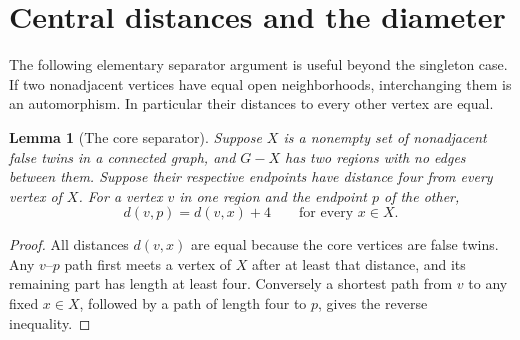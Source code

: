 \documentclass[11pt]{article}
\newtheorem{lemma}[theorem]{Lemma}
\begin{document}
\section*{Central distances and the diameter}

The following elementary separator argument is useful beyond the
singleton case. If two nonadjacent vertices have equal open
neighborhoods, interchanging them is an automorphism. In particular
their distances to every other vertex are equal.

\begin{lemma}[The core separator]\label{separator}
Suppose $X$ is a nonempty set of nonadjacent false twins in a connected
graph, and $G-X$ has two regions with no edges between them. Suppose
their respective endpoints have distance four from every vertex of $X$.
For a vertex $v$ in one region and the endpoint $p$ of the other,
\[
 d(v,p)=d(v,x)+4\qquad\text{for every }x\in X.
\]
\end{lemma}
\begin{proof}
All distances $d(v,x)$ are equal because the core vertices are false
twins. Any $v$--$p$ path first meets a vertex of $X$ after at least that
distance, and its remaining part has length at least four. Conversely
a shortest path from $v$ to any fixed $x\in X$, followed by a path of
length four to $p$, gives the reverse inequality.
\end{proof}
\end{document}
